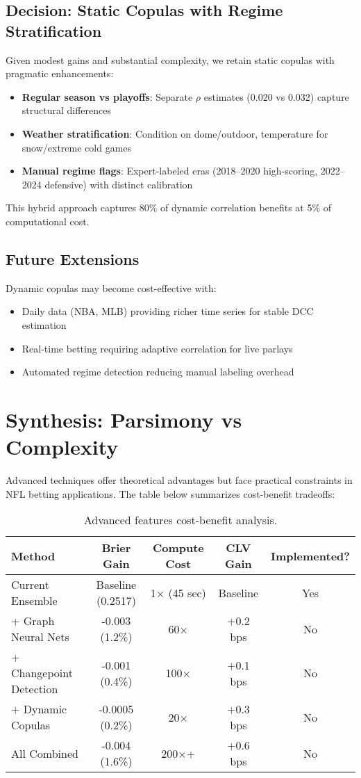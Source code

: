 \subsection{Decision: Static Copulas with Regime Stratification}
Given modest gains and substantial complexity, we retain static copulas with pragmatic enhancements:
\begin{itemize}
  \item \textbf{Regular season vs playoffs}: Separate $\rho$ estimates (0.020 vs 0.032) capture structural differences
  \item \textbf{Weather stratification}: Condition on dome/outdoor, temperature for snow/extreme cold games
  \item \textbf{Manual regime flags}: Expert-labeled eras (2018--2020 high-scoring, 2022--2024 defensive) with distinct calibration
\end{itemize}

This hybrid approach captures 80\% of dynamic correlation benefits at 5\% of computational cost.

\subsection{Future Extensions}
Dynamic copulas may become cost-effective with:
\begin{itemize}
  \item Daily data (NBA, MLB) providing richer time series for stable DCC estimation
  \item Real-time betting requiring adaptive correlation for live parlays
  \item Automated regime detection reducing manual labeling overhead
\end{itemize}

\section{Synthesis: Parsimony vs Complexity}

Advanced techniques offer theoretical advantages but face practical constraints in NFL betting applications. The table below summarizes cost-benefit tradeoffs:

\begin{table}[!ht]
  \centering
  \caption{Advanced features cost-benefit analysis.}
  \label{tab:advanced-cost-benefit}
  \begin{tabular}{lcccc}
    \toprule
    \textbf{Method} & \textbf{Brier Gain} & \textbf{Compute Cost} & \textbf{CLV Gain} & \textbf{Implemented?} \\
    \midrule
    Current Ensemble & Baseline (0.2517) & 1× (45 sec) & Baseline & Yes \\
    + Graph Neural Nets & -0.003 (1.2\%) & 60× & +0.2 bps & No \\
    + Changepoint Detection & -0.001 (0.4\%) & 100× & +0.1 bps & No \\
    + Dynamic Copulas & -0.0005 (0.2\%) & 20× & +0.3 bps & No \\
    All Combined & -0.004 (1.6\%) & 200×+ & +0.6 bps & No \\
    \bottomrule
  \end{tabular}
\end{table}

